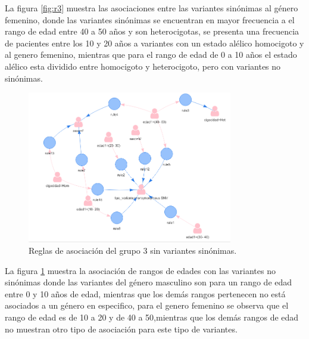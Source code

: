 La figura \ref{fig:r3} muestra las asociaciones entre las variantes sinónimas al género femenino, donde las variantes sinónimas se encuentran en mayor frecuencia a el rango de edad entre 40 a 50 años y son heterocigotas, se presenta una frecuencia de pacientes entre los 10 y 20 años a variantes con un estado alélico homocigoto y al genero femenino, mientras que para el rango de edad de 0 a 10 años el estado alélico esta dividido entre homocigoto y heterocigoto, pero con variantes no sinónimas.

\begin{figure}[H]
	\centering
	\includegraphics[width=0.8\textwidth]{Kap4/reglas3_2}
	\caption{Reglas de asociación del grupo 3 sin variantes sinónimas.} \label{fig:re3}
\end{figure}

La figura \ref{fig:re3} muestra la asociación de rangos de edades con las variantes no sinónimas donde las variantes del género masculino son para un rango de edad entre 0 y 10 años de edad, mientras que los demás rangos pertenecen no está asociados a un género en especifico, para el genero femenino se observa que el rango de edad es de 10 a 20 y de 40 a 50,mientras que los demás rangos de edad no muestran otro tipo de asociación para este tipo de variantes.  

